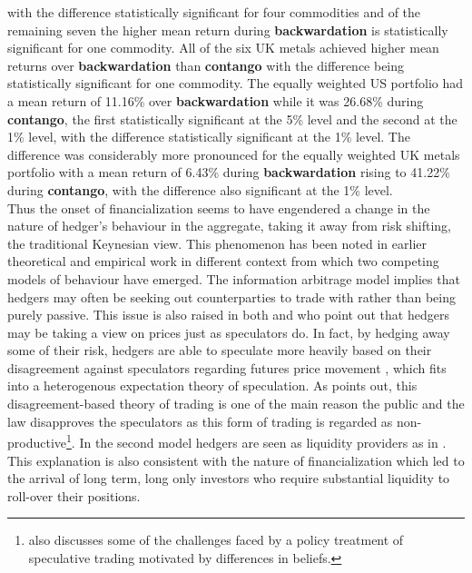 \documentclass[12pt,]{article}
\let\rmarkdownfootnote\footnote%
\def\footnote{\protect\rmarkdownfootnote}
\begin{document}
with the difference statistically significant for four commodities and
of the remaining seven the higher mean return during
\textbf{backwardation} is statistically significant for one commodity.
All of the six UK metals achieved higher mean returns over
\textbf{backwardation} than \textbf{contango} with the difference being
statistically significant for one commodity. The equally weighted US
portfolio had a mean return of 11.16\% over \textbf{backwardation} while
it was 26.68\% during \textbf{contango}, the first statistically
significant at the 5\% level and the second at the 1\% level, with the
difference statistically significant at the 1\% level. The difference
was considerably more pronounced for the equally weighted UK metals
portfolio with a mean return of 6.43\% during \textbf{backwardation}
rising to 41.22\% during \textbf{contango}, with the difference also
significant at the 1\% level.\\
Thus the onset of financialization seems to have engendered a change in
the nature of hedger's behaviour in the aggregate, taking it away from
risk shifting, the traditional Keynesian view. This phenomenon has been
noted in earlier theoretical and empirical work
\citep{DanthineInformationfuturesprices1978, stout_why_1998} in
different context from which two competing models of behaviour have
emerged. The information arbitrage model implies that hedgers may often
be seeking out counterparties to trade with rather than being purely
passive. This issue is also raised in both
\citet{cheng_financialization_2014} and
\citet{StulzRethinkingriskmanagement1996} who point out that hedgers may
be taking a view on prices just as speculators do. In fact, by hedging
away some of their risk, hedgers are able to speculate more heavily
based on their disagreement against speculators regarding futures price
movement \citep{SimsekSpeculationrisksharing2013}, which fits into a
heterogenous expectation theory of speculation. As
\citet{stout_why_1998} points out, this disagreement-based theory of
trading is one of the main reason the public and the law disapproves the
speculators as this form of trading is regarded as
non-productive\footnote{\citet{DuffieChallengespolicytreatment2014} also
  discusses some of the challenges faced by a policy treatment of
  speculative trading motivated by differences in beliefs.}. In the
second model hedgers are seen as liquidity providers as in
\citet{Kangtaletwopremiums2017}. This explanation is also consistent
with the nature of financialization which led to the arrival of long
term, long only investors who require substantial liquidity to roll-over
their positions.
\end{document}

